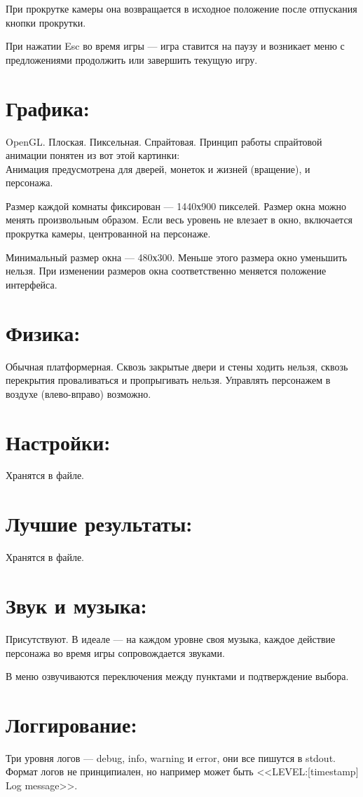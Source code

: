\documentclass[12pt,a4paper]{article}
\begin{document}
При прокрутке камеры она возвращается в исходное положение после отпускания кнопки прокрутки.

При нажатии Esc во время игры --- игра ставится на паузу и возникает меню с предложениями продолжить или завершить текущую игру.
\section{Графика:}
OpenGL. Плоская. Пиксельная. Спрайтовая. Принцип работы спрайтовой анимации понятен из вот этой картинки:\\
Анимация предусмотрена для дверей, монеток и жизней (вращение), и персонажа.

Размер каждой комнаты фиксирован --- 1440х900 пикселей. Размер окна можно менять произвольным образом. Если весь уровень не влезает в окно, включается прокрутка камеры, центрованной на персонаже.

Минимальный размер окна --- 480х300. Меньше этого размера окно уменьшить нельзя. При изменении размеров окна соответственно меняется положение интерфейса.
\section{Физика:}
Обычная платформерная. Сквозь закрытые двери и стены ходить нельзя, сквозь перекрытия проваливаться и пропрыгивать нельзя. Управлять персонажем в воздухе (влево-вправо) возможно.
\section{Настройки:}
Хранятся в файле.
\section{Лучшие результаты:}
Хранятся в файле.
\section{Звук и музыка:}
Присутствуют. В идеале --- на каждом уровне своя музыка, каждое действие персонажа во время игры сопровождается звуками.

В меню озвучиваются переключения между пунктами и подтверждение выбора.
\section{Логгирование:}
Три уровня логов --- debug, info, warning и error, они все пишутся в stdout. Формат логов не принципиален, но например может быть <<LEVEL:[timestamp] Log message>>.
\end{document}
